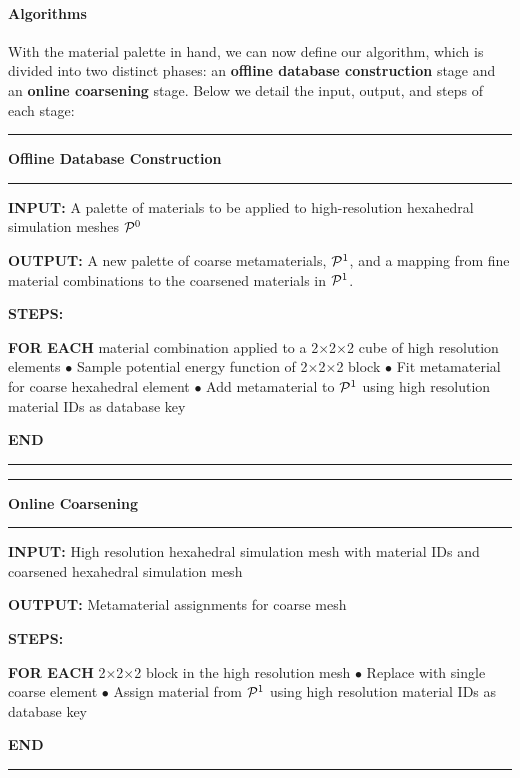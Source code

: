 \paragraph{Algorithms}
With the material palette in hand, we can now define our algorithm, which is divided into two distinct phases: an \textbf{offline database construction} stage and an \textbf{online coarsening} stage.  Below we detail the input, output, and steps of each stage:
\vspace{1mm}
\hrule
\textbf{Offline Database Construction}
\vspace{1mm}
\hrule
\begin{compactitem}
	\item \textbf{INPUT:} A palette of materials to be applied to high-resolution hexahedral simulation meshes $\mathcal{P}^0$
	\item \textbf{OUTPUT:} A new palette of coarse metamaterials, $\mathcal{P}^1$, and a mapping from fine material combinations to the coarsened materials in $\mathcal{P}^1$. 
	\item \textbf{STEPS:}
	\item \textbf{FOR EACH} material combination applied to a 2$\times$2$\times$2 cube of high resolution elements
	\subitem $\bullet$ Sample potential energy function of 2$\times$2$\times$2 block
	\subitem $\bullet$ Fit metamaterial for coarse hexahedral element
	\subitem $\bullet$ Add metamaterial to $\mathcal{P}^1$ using high resolution 
	\subitem material IDs as database key
	\item \textbf{END}
\end{compactitem}
\vspace{1mm}
\hrule
\vspace{1mm}
\hrule
\textbf{Online Coarsening}
\vspace{1mm}
\hrule
\begin{compactitem}
	\item \textbf{INPUT:} High resolution hexahedral simulation mesh with 
	\subitem material IDs and
	\subitem coarsened hexahedral simulation mesh 
	\item \textbf{OUTPUT:} Metamaterial assignments for coarse mesh
	\item \textbf{STEPS:}
	\item \textbf{FOR EACH} 2$\times$2$\times$2 block in the high resolution mesh
	\subitem $\bullet$ Replace with single coarse element
	\subitem $\bullet$ Assign material from $\mathcal{P}^1$ using high resolution 
	\subitem material IDs as database key 
	\item \textbf{END}
\end{compactitem}
\vspace{1mm}
\hrule

